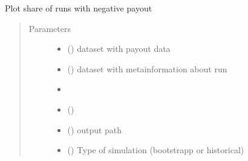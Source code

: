 \documentclass[a4paper,11pt,english]{sphinxmanual}
\begin{document}

\begin{fulllineitems}
\label{\detokenize{simulation_analysis:src.simulation_analysis.task_swap_payout_analysis.plot_negative_payout}}
\sphinxAtStartPar
Plot share of runs with negative payout
\begin{quote}\begin{description}
\item[{Parameters}] \leavevmode\begin{itemize}
\item {} 
\sphinxAtStartPar
{} () \textendash{} dataset with payout data

\item {} 
\sphinxAtStartPar
{} () \textendash{} dataset with metainformation about run

\item {} 
\sphinxAtStartPar
\sphinxstyleliteralstrong{\sphinxupquote{(}} \textendash{} 

\item {} 
\sphinxAtStartPar
{}\sphinxstyleliteralstrong{\sphinxupquote{)}} () \textendash{} 

\item {} 
\sphinxAtStartPar
{} () \textendash{} output path

\item {} 
\sphinxAtStartPar
{} () \textendash{} Type of simulation (bootstrapp or historical)

\end{itemize}

\end{description}\end{quote}

\end{fulllineitems}
\end{document}
